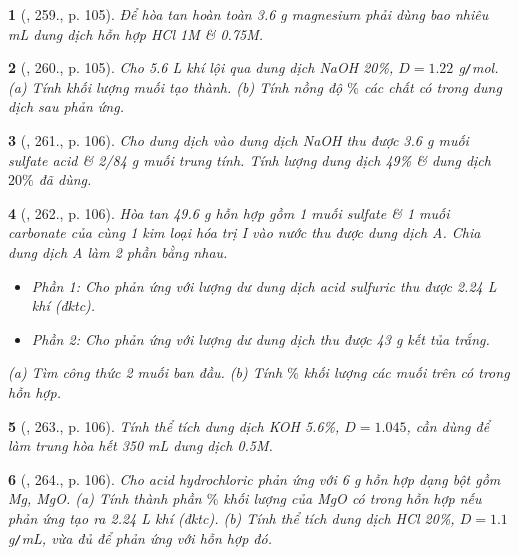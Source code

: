 \documentclass{article}
\newtheorem{baitoan}{}
\begin{document}
\begin{baitoan}[\cite{Nguyen_Buu_Can_500_BT_Hoa_Hoc_THCS}, 259., p. 105]
	Để hòa tan hoàn toàn {\rm3.6 g} magnesium phải dùng bao nhiêu {\rm mL} dung dịch hỗn hợp {\rm HCl 1M} \& {\rm{} 0.75M}.
\end{baitoan}

\begin{baitoan}[\cite{Nguyen_Buu_Can_500_BT_Hoa_Hoc_THCS}, 260., p. 105]
	Cho {\rm5.6 L} khí {\rm{}} lội qua dung dịch {\rm NaOH 20\%}, $D = 1.22$ {\rm g{\tt/}mol}. (a) Tính khối lượng muối tạo thành. (b) Tính nồng độ $\%$ các chất có trong dung dịch sau phản ứng.
\end{baitoan}

\begin{baitoan}[\cite{Nguyen_Buu_Can_500_BT_Hoa_Hoc_THCS}, 261., p. 106]
	Cho dung dịch {\rm{}} vào dung dịch {\rm NaOH} thu được {\rm3.6 g} muối sulfate acid \& {\rm2/84 g} muối trung tính. Tính lượng dung dịch {\rm{} 49\%} \& dung dịch $20\%$ đã dùng.
\end{baitoan}

\begin{baitoan}[\cite{Nguyen_Buu_Can_500_BT_Hoa_Hoc_THCS}, 262., p. 106]
	Hòa tan {\rm49.6 g} hỗn hợp gồm 1 muối sulfate \& 1 muối carbonate của cùng 1 kim loại hóa trị {\rm I} vào nước thu được dung dịch A. Chia dung dịch A làm 2 phần bằng nhau.
	\begin{itemize}
		\item Phần 1: Cho phản ứng với lượng dư dung dịch acid sulfuric thu được {\rm2.24 L} khí (đktc).
		\item Phần 2: Cho phản ứng với lượng dư dung dịch {\rm{}} thu được {\rm43 g} kết tủa trắng.
	\end{itemize}
	(a) Tìm công thức 2 muối ban đầu. (b) Tính $\%$ khối lượng các muối trên có trong hỗn hợp.
\end{baitoan}

\begin{baitoan}[\cite{Nguyen_Buu_Can_500_BT_Hoa_Hoc_THCS}, 263., p. 106]
	Tính thể tích dung dịch {\rm KOH 5.6\%}, $D = 1.045$, cần dùng để làm trung hòa hết {\rm350 mL} dung dịch {\rm{} 0.5M}.
\end{baitoan}

\begin{baitoan}[\cite{Nguyen_Buu_Can_500_BT_Hoa_Hoc_THCS}, 264., p. 106]
	Cho acid hydrochloric phản ứng với {\rm6 g} hỗn hợp dạng bột gồm {\rm Mg, MgO}. (a) Tính thành phần $\%$ khối lượng của {\rm MgO} có trong hỗn hợp nếu phản ứng tạo ra {\rm2.24 L} khí {\rm{}} (đktc). (b) Tính thể tích dung dịch {\rm HCl 20\%}, $D = 1.1$ {\rm g{\tt/}mL}, vừa đủ để phản ứng với hỗn hợp đó.
\end{baitoan}
\end{document}

